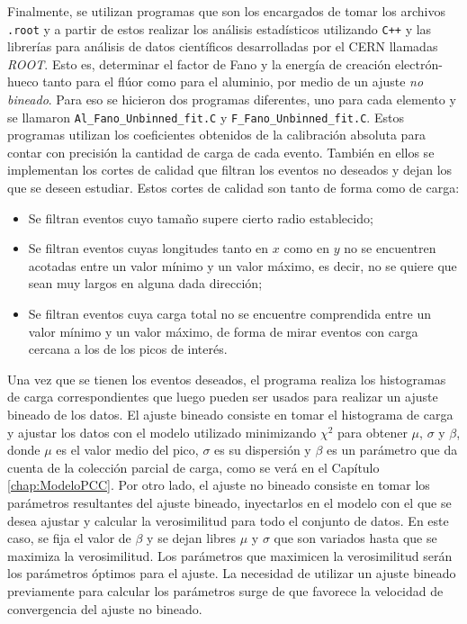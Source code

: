 Finalmente, se utilizan programas que son los encargados de tomar los archivos \verb|.root| y a partir de estos realizar los análisis estadísticos utilizando \verb|C++| y las librerías para análisis de datos científicos desarrolladas por el CERN llamadas \textit{ROOT}. Esto es, determinar el factor de Fano y la energía de creación electrón-hueco tanto para el flúor como para el aluminio, por medio de un ajuste \textit{no bineado}. Para eso se hicieron dos programas diferentes, uno para cada elemento y se llamaron \verb|Al_Fano_Unbinned_fit.C| y \verb|F_Fano_Unbinned_fit.C|. Estos programas utilizan los coeficientes obtenidos de la calibración absoluta para contar con precisión la cantidad de carga de cada evento. También en ellos se implementan los cortes de calidad que filtran los eventos no deseados y dejan los que se deseen estudiar. Estos cortes de calidad son tanto de forma como de carga: 
\begin{itemize}
    \item Se filtran eventos cuyo tamaño supere cierto radio establecido;
    \item Se filtran eventos cuyas longitudes tanto en $x$ como en $y$ no se encuentren acotadas entre un valor mínimo y un valor máximo, es decir, no se quiere que sean muy largos en alguna dada dirección;
    \item Se filtran eventos cuya carga total no se encuentre comprendida entre un valor mínimo y un valor máximo, de forma de mirar eventos con carga cercana a los de los picos de interés.
\end{itemize}
Una vez que se tienen los eventos deseados, el programa realiza los histogramas de carga correspondientes que luego pueden ser usados para realizar un ajuste bineado de los datos. El ajuste bineado consiste en tomar el histograma de carga y ajustar los datos con el modelo utilizado minimizando $\chi^{2}$ para obtener $\mu$, $\sigma$ y $\beta$, donde $\mu$ es el valor medio del pico, $\sigma$ es su dispersión y $\beta$ es un parámetro que da cuenta de la colección parcial de carga, como se verá en el Capítulo \ref{chap:ModeloPCC}. Por otro lado, el ajuste no bineado consiste en tomar los parámetros resultantes del ajuste bineado, inyectarlos en el modelo con el que se desea ajustar y calcular la verosimilitud para todo el conjunto de datos. En este caso, se fija el valor de $\beta$ y se dejan libres $\mu$ y $\sigma$ que son variados hasta que se maximiza la verosimilitud. Los parámetros que maximicen la verosimilitud serán los parámetros óptimos para el ajuste. La necesidad de utilizar un ajuste bineado previamente para calcular los parámetros surge de que favorece la velocidad de convergencia del ajuste no bineado.

